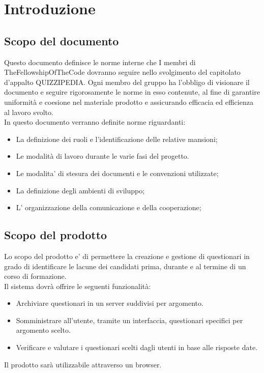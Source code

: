 \section{Introduzione}

\subsection{Scopo del documento}
Questo documento definisce le norme interne che I membri di TheFellowshipOfTheCode dovranno seguire nello svolgimento del capitolato d’appalto QUIZZIPEDIA. Ogni membro del gruppo ha l’obbligo di visionare il documento e seguire rigorosamente le norme in esso contenute, al fine di garantire uniformità e coesione nel materiale prodotto e assicurando efficacia ed efficienza al lavoro svolto.
\\In questo documento verranno definite norme riguardanti:
\begin{itemize}
\item
La definizione dei ruoli e l’identificazione delle relative mansioni;	
\item
Le modalità di lavoro durante le varie fasi del progetto.
\item
Le modalita' di stesura dei documenti e le convenzioni utilizzate;
\item
La definizione degli ambienti di sviluppo;
\item
L' organizzazione della comunicazione e della cooperazione;
\end{itemize}

\subsection{Scopo del prodotto}
Lo scopo del prodotto e' di permettere la creazione e gestione di questionari in grado di identificare le lacune dei candidati prima, durante e al termine di un corso di formazione. 
\\Il sistema dovrà offrire le seguenti funzionalità:
\begin{itemize}
\item
Archiviare questionari in un server suddivisi per argomento.
\item
Somministrare all'utente, tramite un interfaccia, questionari specifici per argomento scelto.
\item
Verificare e valutare i questionari scelti dagli utenti in base alle risposte date.
\end{itemize}

Il prodotto sarà utilizzabile attraverso un browser.

